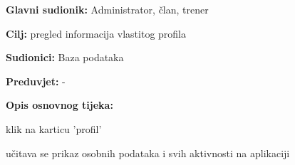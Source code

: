 					\noindent {}
					\begin{packed_item}
	
						\item \textbf{Glavni sudionik: }Administrator, član, trener
						\item  \textbf{Cilj: } pregled informacija vlastitog profila
						\item  \textbf{Sudionici: } Baza podataka
						\item  \textbf{Preduvjet: } -
						\item  \textbf{Opis osnovnog tijeka:}
						
						\item[] \begin{packed_enum}
	
							\item klik na karticu 'profil'
							\item učitava se prikaz osobnih podataka i svih aktivnosti na aplikaciji
							
						\end{packed_enum}
					\end{packed_item}
					

